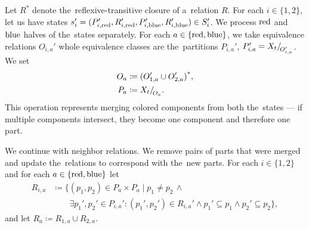 Let \( R^* \) denote the~reflexive-transitive closure of a~relation \( R \).
For each \( i \in \{1, 2\} \), let us have states
\( s_i' = (P_{i,\text{red}}', R_{i,\text{red}}', P_{i,\text{blue}}', R_{i,\text{blue}}') \in S_i' \).
%
We process \( \text{red} \) and \( \text{blue} \) halves of the~states separately.
For each \( a \in \{\text{red}, \text{blue}\} \),
we take equivalence relations \( O_{i, a}' \)
whole equivalence classes are the~partitions \( P_{i, a}' \),
\( P_{i, a}' = X_t{/\!}_{O_{i, a}'}\).
We set
%
\begin{equation}%
	\label{eq:fpt_reflexive_transitive_closure}
	\begin{aligned}
		O_a & \coloneqq {(O_{1, a}' \cup O_{2, a}')}^*, \\
		P_a & \coloneqq \equivclass{X_t}{O_a}.
	\end{aligned}
\end{equation}
%
This operation represents merging colored components from both the~states
--- if multiple components intersect, they become one
component and therefore one part.

We continue with neighbor relations. We remove pairs of parts
that were merged and update the~relations to correspond with the~new parts.
For each \( i \in \{1, 2\} \) and for each \( a \in \{\text{red}, \text{blue}\} \) let
%
\begin{align*}
	R_{i,a} & \coloneqq \{(p_1, p_2) \in P_a \times P_a \mid p_{1} \ne p_{2} \, \land                                                 \\
	        & \qquad \exists p_1', p_2' \in P_{i,a}' : (p_1', p_2') \in R_{i,a}' \land p_1' \subseteq p_1 \land p_2' \subseteq p_2\},
\end{align*}
%
and let \( R_a \coloneqq R_{1,a} \cup R_{2,a} \).

